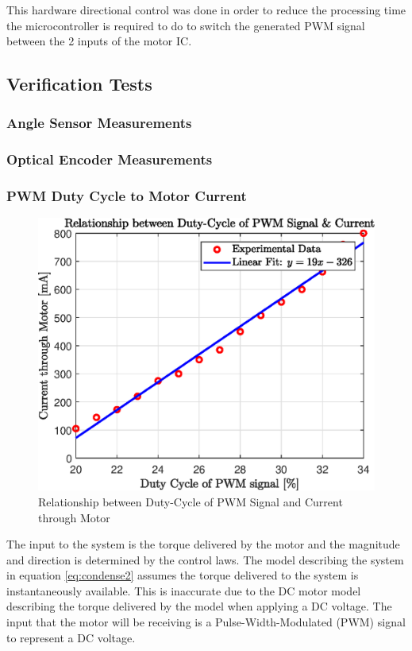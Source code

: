 This hardware directional control was done in order to reduce the processing time the microcontroller is required to do to switch the generated PWM signal between the 2 inputs of the motor IC.

\subsection{Verification Tests}

\subsubsection{Angle Sensor Measurements}

\subsubsection{Optical Encoder Measurements}

\subsubsection{ PWM Duty Cycle to Motor Current}

\begin{figure}[h]
	\centering
	\includegraphics[scale=1]{./figs/dutycycle_vs_current.eps}
	\caption{Relationship between Duty-Cycle of PWM Signal and Current through Motor}
	\label{fig:dutycycle_vs_current}
\end{figure}

The input to the system is the torque delivered by the motor and the magnitude and direction is determined by the control laws. The model describing the system in equation \ref{eq:condense2} assumes the torque delivered to the system is instantaneously available. This is inaccurate due to the DC motor model describing the torque delivered by the model when applying a DC voltage. The input that the motor will be receiving is a Pulse-Width-Modulated (PWM) signal to represent a DC voltage.

